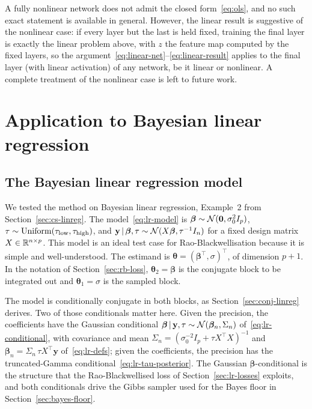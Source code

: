 A fully nonlinear network does not admit the closed
 form~\eqref{eq:ols}, and no such exact statement is available in general. However, the
linear result is suggestive of the nonlinear case: if
every layer but the last is held fixed, training the final layer is
exactly the linear problem above, with $z$ the feature map computed
by the fixed layers, so the
argument~\eqref{eq:linear-net}--\eqref{eq:linear-result} applies to
the final layer (with linear activation) of any network, be it linear or nonlinear. A complete treatment of the nonlinear
case is left to future work.



\section{Application to Bayesian linear regression}
\label{sec:rb-application}

\subsection{The Bayesian linear regression model}
\label{sec:lr-model}

We tested the method on Bayesian linear regression, Example~2 from Section~\ref{sec:cs-linreg}. The
model~\eqref{eq:lr-model} is
$\bm{\beta} \sim \mathcal{N}(\mathbf{0}, \sigma_0^2 I_p)$,
$\tau \sim \mathrm{Uniform}(\tau_{\text{low}}, \tau_{\text{high}})$, and
$\mathbf{y} \,|\, \bm{\beta}, \tau \sim
\mathcal{N}(X\bm{\beta}, \tau^{-1} I_{n})$ for a fixed design matrix
$X \in \mathbb{R}^{n \times p}$. This model is an ideal test case for Rao-Blackwellisation because it is simple and well-understood. The estimand is $\bm{\theta} = (\bm{\beta}^{\!\top}, \sigma)^{\!\top}$,
of dimension $p+1$. In the notation of Section~\ref{sec:rb-loss},
$\bm{\theta}_2 = \bm{\beta}$ is the conjugate block to be integrated
out and $\bm{\theta}_1 = \sigma$ is the sampled block.

The model is conditionally conjugate in both blocks, as
Section~\ref{sec:conj-linreg} derives. Two of those conditionals matter
here. Given the precision, the coefficients have the Gaussian
conditional
$\bm{\beta} \,|\, \mathbf{y}, \tau \sim
\mathcal{N}(\bm{\beta}_n, \Sigma_n)$ of~\eqref{eq:lr-conditional}, with
covariance and mean
$\Sigma_n = (\sigma_0^{-2} I_p + \tau X^{\!\top}X)^{-1}$ and
$\bm{\beta}_n = \Sigma_n\,\tau X^{\!\top}\mathbf{y}$
of~\eqref{eq:lr-defs}; given the coefficients, the precision has the
truncated-Gamma conditional~\eqref{eq:lr-tau-posterior}. The Gaussian
$\bm{\beta}$-conditional is the structure that the Rao-Blackwellised
loss of Section~\ref{sec:lr-losses} exploits, and both conditionals
drive the Gibbs sampler used for the Bayes floor in
Section~\ref{sec:bayes-floor}.

